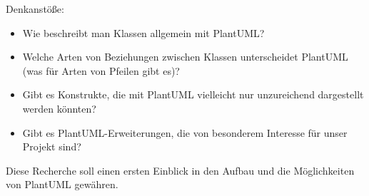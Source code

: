 Denkanstöße:
\begin{itemize}
\item Wie beschreibt man Klassen allgemein mit PlantUML?
\item Welche Arten von Beziehungen zwischen Klassen unterscheidet PlantUML (was für Arten von Pfeilen gibt es)?
\item Gibt es Konstrukte, die mit PlantUML vielleicht nur unzureichend dargestellt werden könnten?
\item Gibt es PlantUML-Erweiterungen, die von besonderem Interesse für unser Projekt sind?
\end{itemize}
Diese Recherche soll einen ersten Einblick in den Aufbau und die Möglichkeiten von PlantUML gewähren.
\nsecend


